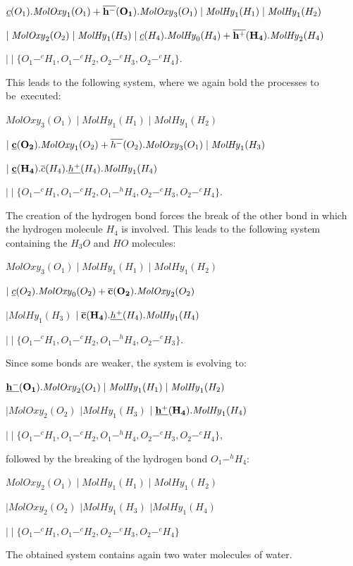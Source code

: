 \documentclass[runningheads]{llncs}
\newcommand{\MolOxy}{\mathit{MolOxy}}
\newcommand{\MolHy}{\mathit{MolHy}}
\begin{document}
\begin{example}
\centerline{$\underline{c}(O_1).\MolOxy_1(O_1) +{\bf \overline{h^-}(O_1)}.
\MolOxy_3(O_1) \mid \MolHy_1(H_1) \mid \MolHy_1(H_2) $}

\centerline{$\mid \MolOxy_2(O_2) \mid \MolHy_1(H_3) \mid \underline{c}(H_4).
\MolHy_0(H_4) + {\bf \overline{h^+}(H_4)}.\MolHy_2(H_4)$}


\centerline{$\mid\mid \{O_1 -^c H_1, O_1 -^c H_2, O_2 -^c H_3, O_2 -^c H_4\}$.}

\noindent 
This leads to the following system, where we again bold the processes to be~executed:

\centerline{$\MolOxy_3(O_1) \mid \MolHy_1(H_1) \mid \MolHy_1(H_2) $}

\centerline{$\mid {\bf \underline{c}(O_2)}.\MolOxy_1(O_2) +\overline{h^-}(O_2).\MolOxy_3(O_1) \mid \MolHy_1(H_3)$}

\centerline{$ \mid {\bf \underline{c}(H_4)}.\overline{c}(H_4).\underline{h^+}(H_4).\MolHy_{1}(H_4)$}

\centerline{$\mid\mid \{O_1 -^c H_1, O_1 -^c H_2, O_1-^h H_4,O_2 -^c H_3, O_2 -^c H_4\}$.}

\noindent 
The creation of the hydrogen bond forces the break of the other bond in 
which the hydrogen molecule $H_4$ is involved. This leads to the following
system containing the $H_3O$ and $HO$ molecules:

\centerline{$\MolOxy_3(O_1) \mid \MolHy_1(H_1) \mid \MolHy_1(H_2) $}

\centerline{$\mid \underline{c}(O_2).\MolOxy_0(O_2) +{\bf \overline{c}(O_2)}.\MolOxy_2(O_2)$}

\centerline{$ \mid \MolHy_1(H_3)$ $ \mid {\bf \overline{c}(H_4)}.\underline{h^+}(H_4).\MolHy_{1}(H_4)$}

\centerline{$\mid\mid \{O_1 -^c H_1, O_1 -^c H_2, O_1-^h H_4,O_2 -^c H_3\}$.}

\noindent 
Since some bonds are weaker, the system is evolving to:

\centerline{${\bf \underline{h^-}(O_1)}.\MolOxy_2(O_1) \mid \MolHy_1(H_1) \mid \MolHy_1(H_2) $}

\centerline{$\mid \MolOxy_2(O_2)$ $ \mid \MolHy_1(H_3)$ $ \mid {\bf \underline{h^+}(H_4)}.\MolHy_{1}(H_4)$}

\centerline{$\mid\mid \{O_1 -^c H_1, O_1 -^c H_2, O_1-^h H_4,O_2 -^c H_3, O_2 -^c H_4\}$,}

\noindent 
followed by the breaking of the hydrogen bond $O_1-^h H_4$:

\centerline{$\MolOxy_2(O_1) \mid \MolHy_1(H_1) \mid \MolHy_1(H_2) $}

\centerline{$\mid \MolOxy_2(O_2)$ $ \mid \MolHy_1(H_3)$ $ \mid \MolHy_{1}(H_4)$}

\centerline{$\mid\mid \{O_1 -^c H_1, O_1 -^c H_2, O_2 -^c H_3, O_2 -^c H_4\}$}

\noindent 
The obtained system contains again two water molecules of water.
\end{example}
\end{document}
